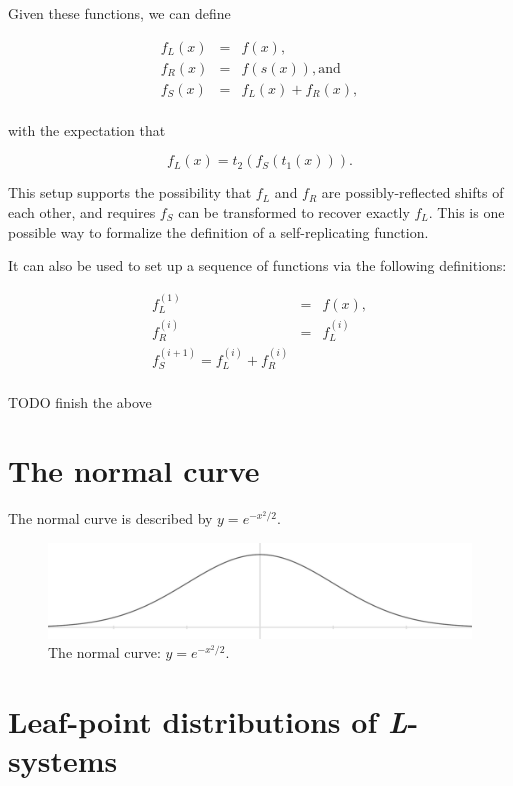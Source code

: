 \documentclass[20pt,]{extarticle}
\begin{document}
Given these functions, we can define

\[\begin{array}{rcl}
  f_L(x) & = & f(x), \\
  f_R(x) & = & f(s(x)), \text{and} \\
  f_S(x) & = & f_L(x) + f_R(x), \\
\end{array}\]

with the expectation that

\[f_L(x) = t_2(f_S(t_1(x))).\]

This setup supports the possibility that \(f_L\) and \(f_R\) are
possibly-reflected shifts of each other, and requires \(f_S\) can be
transformed to recover exactly \(f_L\). This is one possible way to
formalize the definition of a self-replicating function.

It can also be used to set up a sequence of functions via the following
definitions:

\[\begin{array}{rcl}
  f^{(1)}_L & = & f(x), \\
  f^{(i)}_R & = & f^{(i)}_L \\
  f^{(i+1)}_S = f^{(i)}_L + f^{(i)}_R \\
\end{array}\]

TODO finish the above

\section{The normal curve}\label{the-normal-curve}

The normal curve is described by \(y = e^{-x^2/2}\).

\begin{figure}[htbp]
\centering
\includegraphics{images/pdfs/normal3.pdf}
\caption{The normal curve: \(y=e^{-x^2/2}\).}
\end{figure}

\section{\texorpdfstring{Leaf-point distributions of
\emph{L}-systems}{Leaf-point distributions of L-systems}}\label{leaf-point-distributions-of-l-systems}
\end{document}
